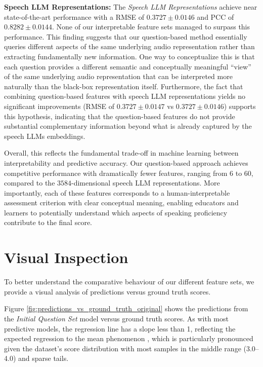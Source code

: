 \documentclass{report}
\begin{document}
\textbf{Speech LLM Representations:} The \emph{Speech LLM Representations} achieve near state-of-the-art performance with a RMSE of $0.3727 \pm 0.0146$ and PCC of $0.8282 \pm 0.0144$. None of our interpretable feature sets managed to surpass this performance. This finding suggests that our question-based method essentially queries different aspects of the same underlying audio representation rather than extracting fundamentally new information. One way to conceptualize this is that each question provides a different semantic and conceptually meaningful ``view'' of the same underlying audio representation that can be interpreted more naturally than the black-box representation itself. Furthermore, the fact that combining question-based features with speech LLM representations yields no significant improvements (RMSE of $0.3727 \pm 0.0147$ vs $0.3727 \pm 0.0146$) supports this hypothesis, indicating that the question-based features do not provide substantial complementary information beyond what is already captured by the speech LLMs embeddings.

Overall, this reflects the fundamental trade-off in machine learning between interpretability and predictive accuracy. Our question-based approach achieves competitive performance with dramatically fewer features, ranging from 6 to 60, compared to the $3584$-dimensional speech LLM representations. More importantly, each of these features corresponds to a human-interpretable assessment criterion with clear conceptual meaning, enabling educators and learners to potentially understand which aspects of speaking proficiency contribute to the final score.

\section{Visual Inspection}
\label{sec:visual_inspection}
To better understand the comparative behaviour of our different feature sets, we provide a visual analysis of predictions versus ground truth scores.

Figure \ref{fig:predictions_vs_ground_truth_original} shows the predictions from the \emph{Initial Question Set} model versus ground truth scores. As with most predictive models, the regression line has a slope less than 1, reflecting the expected regression to the mean phenomenon \citep{galton_1886_1449548}, which is particularly pronounced given the dataset's score distribution with most samples in the middle range (3.0–4.0) and sparse tails.
\end{document}
